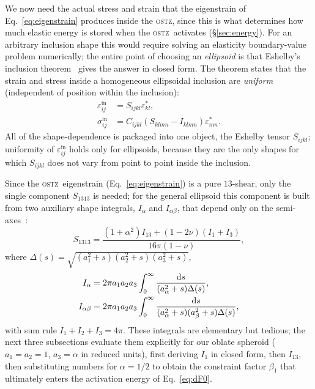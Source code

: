 \documentclass[3p]{elsarticle}
\newcommand{\OSTZ}{\textsc{ostz}}
\begin{document}
We now need the actual stress and strain that the eigenstrain of
Eq.~\eqref{eq:eigenstrain} produces inside the \OSTZ, since this is
what determines how much elastic energy is stored when the \OSTZ\
activates (\S\ref{sec:energy}). For an arbitrary inclusion shape this
would require solving an elasticity boundary-value problem
numerically; the entire point of choosing an \emph{ellipsoid} is that
Eshelby's inclusion theorem~\citep{eshelby1957} gives the answer in
closed form. The theorem states that the strain and stress inside a
homogeneous ellipsoidal inclusion are \emph{uniform} (independent of
position within the inclusion):
\begin{align}
  \varepsilon_{ij}^\mathrm{in}&=S_{ijkl}\varepsilon^*_{kl},
    \label{eq:eshelby1}\\
  \sigma_{ij}^\mathrm{in}&=C_{ijkl}(S_{klmn}-I_{klmn})\varepsilon^*_{mn}.
    \label{eq:eshelby2}
\end{align}
All of the shape-dependence is packaged into one object, the Eshelby
tensor $S_{ijkl}$; uniformity of $\varepsilon^\mathrm{in}_{ij}$ holds
only for ellipsoids, because they are the only shapes for which
$S_{ijkl}$ does not vary from point to point inside the inclusion.

Since the \OSTZ\ eigenstrain (Eq.~\eqref{eq:eigenstrain}) is a pure
$13$-shear, only the single component $S_{1313}$ is needed; for the
general ellipsoid this component is built from two auxiliary shape
integrals, $I_\alpha$ and $I_{\alpha\beta}$, that depend only on the
semi-axes~\citep{mura1987}:
\begin{equation}
  S_{1313}=\frac{(1+\alpha^2)I_{13}+(1-2\nu)(I_1+I_3)}{16\pi(1-\nu)},
  \label{eq:S1313}
\end{equation}
where $\Delta(s)=\sqrt{(a_1^2{+}s)(a_2^2{+}s)(a_3^2{+}s)}$,
\begin{align}
  I_\alpha&=2\pi a_1 a_2 a_3\int_0^\infty
    \frac{\mathrm ds}{(a_\alpha^2+s)\Delta(s)},
    \label{eq:Ialpha}\\
  I_{\alpha\beta}&=2\pi a_1 a_2 a_3\int_0^\infty
    \frac{\mathrm ds}{(a_\alpha^2+s)(a_\beta^2+s)\Delta(s)},\notag
\end{align}
with sum rule $I_1+I_2+I_3=4\pi$. These integrals are elementary but
tedious; the next three subsections evaluate them explicitly for our
oblate spheroid ($a_1=a_2=1$, $a_3=\alpha$ in reduced units), first
deriving $I_1$ in closed form, then $I_{13}$, then substituting
numbers for $\alpha=1/2$ to obtain the constraint factor $\beta_1$
that ultimately enters the activation energy of Eq.~\eqref{eq:dF0}.
\end{document}
